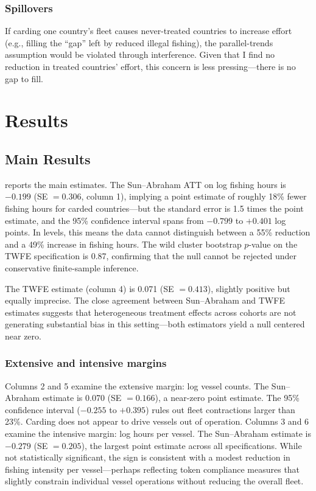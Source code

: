 \documentclass[12pt]{article}
\begin{document}
\subsubsection*{Spillovers} If carding one country's fleet causes never-treated countries to increase effort (e.g., filling the ``gap'' left by reduced illegal fishing), the parallel-trends assumption would be violated through interference. Given that I find no reduction in treated countries' effort, this concern is less pressing---there is no gap to fill.


\section{Results}
\label{sec:results}

\subsection{Main Results}

 reports the main estimates. The Sun--Abraham ATT on log fishing hours is $-0.199$ (SE $= 0.306$, column 1), implying a point estimate of roughly 18\% fewer fishing hours for carded countries---but the standard error is 1.5 times the point estimate, and the 95\% confidence interval spans from $-0.799$ to $+0.401$ log points. In levels, this means the data cannot distinguish between a 55\% reduction and a 49\% increase in fishing hours. The wild cluster bootstrap $p$-value on the TWFE specification is 0.87, confirming that the null cannot be rejected under conservative finite-sample inference.

The TWFE estimate (column 4) is 0.071 (SE $= 0.413$), slightly positive but equally imprecise. The close agreement between Sun--Abraham and TWFE estimates suggests that heterogeneous treatment effects across cohorts are not generating substantial bias in this setting---both estimators yield a null centered near zero.

\subsubsection*{Extensive and intensive margins} Columns 2 and 5 examine the extensive margin: log vessel counts. The Sun--Abraham estimate is 0.070 (SE $= 0.166$), a near-zero point estimate. The 95\% confidence interval ($-0.255$ to $+0.395$) rules out fleet contractions larger than 23\%. Carding does not appear to drive vessels out of operation. Columns 3 and 6 examine the intensive margin: log hours per vessel. The Sun--Abraham estimate is $-0.279$ (SE $= 0.205$), the largest point estimate across all specifications. While not statistically significant, the sign is consistent with a modest reduction in fishing intensity per vessel---perhaps reflecting token compliance measures that slightly constrain individual vessel operations without reducing the overall fleet.
\end{document}
